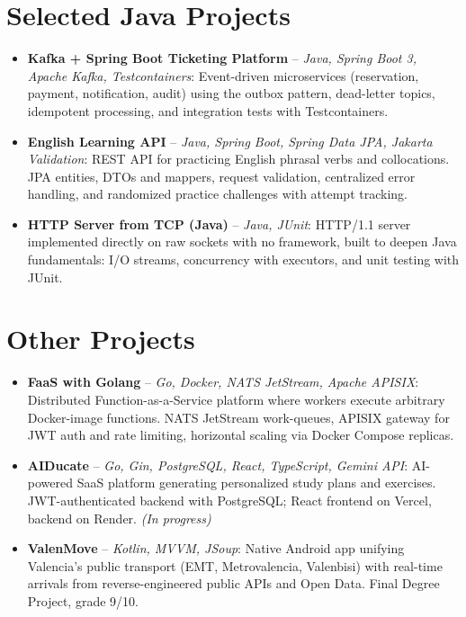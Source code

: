 \documentclass[11pt,a4paper,sans]{moderncv}
\begin{document}
\section{Selected Java Projects}
\vspace{1pt}
\begin{itemize}

\item \textbf{Kafka + Spring Boot Ticketing Platform} -- \textit{Java, Spring Boot 3, Apache Kafka, Testcontainers}: Event-driven microservices (reservation, payment, notification, audit) using the outbox pattern, dead-letter topics, idempotent processing, and integration tests with Testcontainers.

\item \textbf{English Learning API} -- \textit{Java, Spring Boot, Spring Data JPA, Jakarta Validation}: REST API for practicing English phrasal verbs and collocations. JPA entities, DTOs and mappers, request validation, centralized error handling, and randomized practice challenges with attempt tracking.

\item \textbf{HTTP Server from TCP (Java)} -- \textit{Java, JUnit}: HTTP/1.1 server implemented directly on raw sockets with no framework, built to deepen Java fundamentals: I/O streams, concurrency with executors, and unit testing with JUnit.

\end{itemize}


\section{Other Projects}
\vspace{1pt}
\begin{itemize}

\item \textbf{FaaS with Golang} -- \textit{Go, Docker, NATS JetStream, Apache APISIX}: Distributed Function-as-a-Service platform where workers execute arbitrary Docker-image functions. NATS JetStream work-queues, APISIX gateway for JWT auth and rate limiting, horizontal scaling via Docker Compose replicas.

\item \textbf{AIDucate} -- \textit{Go, Gin, PostgreSQL, React, TypeScript, Gemini API}: AI-powered SaaS platform generating personalized study plans and exercises. JWT-authenticated backend with PostgreSQL; React frontend on Vercel, backend on Render. \textit{(In progress)}

\item \textbf{ValenMove} -- \textit{Kotlin, MVVM, JSoup}: Native Android app unifying Valencia's public transport (EMT, Metrovalencia, Valenbisi) with real-time arrivals from reverse-engineered public APIs and Open Data. Final Degree Project, grade 9/10.

\end{itemize}
\end{document}

